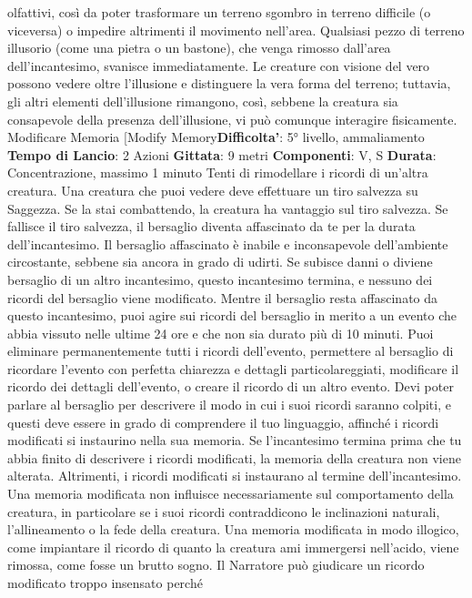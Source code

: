 \begin{multicols}{2}
olfattivi, così da poter trasformare un terreno sgombro
in terreno difficile (o viceversa) o impedire altrimenti il
movimento nell’area. Qualsiasi pezzo di terreno illusorio
(come una pietra o un bastone), che venga rimosso
dall’area dell’incantesimo, svanisce immediatamente.
Le creature con visione del vero possono vedere oltre
l’illusione e distinguere la vera forma del terreno;
tuttavia, gli altri elementi dell’illusione rimangono, così,
sebbene la creatura sia consapevole della presenza
dell’illusione, vi può comunque interagire fisicamente.
Modificare Memoria
[Modify Memory\textbf{Difficolta'}:
5° livello, ammaliamento
\textbf{Tempo di Lancio}: 2 Azioni
\textbf{Gittata}: 9 metri
\textbf{Componenti}: V, S
\textbf{Durata}: Concentrazione, massimo 1 minuto
Tenti di rimodellare i ricordi di un’altra creatura. Una
creatura che puoi vedere deve effettuare un tiro
salvezza su Saggezza. Se la stai combattendo, la
creatura ha vantaggio sul tiro salvezza. Se fallisce il tiro
salvezza, il bersaglio diventa affascinato da te per la
durata dell’incantesimo. Il bersaglio affascinato è inabile
e inconsapevole dell’ambiente circostante, sebbene sia
ancora in grado di udirti. Se subisce danni o diviene
bersaglio di un altro incantesimo, questo incantesimo 
termina, e nessuno dei ricordi del bersaglio viene
modificato.
Mentre il bersaglio resta affascinato da questo
incantesimo, puoi agire sui ricordi del bersaglio in
merito a un evento che abbia vissuto nelle ultime 24 ore
e che non sia durato più di 10 minuti. Puoi eliminare
permanentemente tutti i ricordi dell’evento, permettere
al bersaglio di ricordare l’evento con perfetta chiarezza
e dettagli particolareggiati, modificare il ricordo dei
dettagli dell’evento, o creare il ricordo di un altro evento.
Devi poter parlare al bersaglio per descrivere il modo in
cui i suoi ricordi saranno colpiti, e questi deve essere in
grado di comprendere il tuo linguaggio, affinché i ricordi
modificati si instaurino nella sua memoria. Se
l’incantesimo termina prima che tu abbia finito di
descrivere i ricordi modificati, la memoria della creatura
non viene alterata. Altrimenti, i ricordi modificati si
instaurano al termine dell’incantesimo.
Una memoria modificata non influisce necessariamente
sul comportamento della creatura, in particolare se i
suoi ricordi contraddicono le inclinazioni naturali,
l’allineamento o la fede della creatura. Una memoria
modificata in modo illogico, come impiantare il ricordo di
quanto la creatura ami immergersi nell’acido, viene
rimossa, come fosse un brutto sogno. Il Narratore può
giudicare un ricordo modificato troppo insensato perché

\end{multicols}
